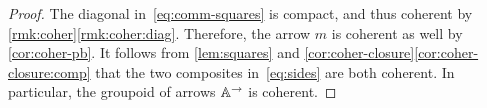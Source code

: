 \documentclass[a4paper,11pt]{amsart}
\newcommand{\kpdcincat}[1]{\argpdf{#1}\hspace{-2ex}\underset{\mbox{\tiny$\obgpdf{#1}\!\!\times\!\!\obgpdf{#1}$}}{\times}\hspace{-2ex}\argpdf{#1}}
\newcommand{\Akpdcin}{\kpdcincat{A}}
\newcommand{\sqincat}[1]{\mathrm{Sq}_{#1}}
\newcommand{\Asqin}{\sqincat{\Agpdf}}
\newcommand{\csqincat}[1]{\mathrm{CSq}_{#1}}
\newcommand{\Acsqin}{\csqincat{\Agpdf}}
\begin{document}
\begin{proof}
	The diagonal in~\eqref{eq:comm-squares} is compact, and thus coherent by \cref{rmk:coher}\eqref{rmk:coher:diag}.
	Therefore, the arrow $m$ is coherent as well by \cref{cor:coher-pb}.
	It follows from \cref{lem:squares} and \cref{cor:coher-closure}\eqref{cor:coher-closure:comp}
	that the two composites in~\eqref{eq:sides} are both coherent.
	In particular, the groupoid of arrows $\mathbb{A}^\to$ is coherent.
%	
%	
%	

\end{proof}
\end{document}
